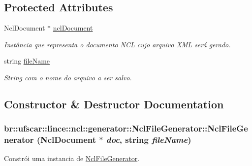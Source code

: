 \subsection*{Protected Attributes}
\begin{DoxyCompactItemize}
\item 
NclDocument $\ast$ \hyperlink{classbr_1_1ufscar_1_1lince_1_1ncl_1_1generator_1_1NclFileGenerator_adbc2970dc25159b55e4b18ef2cf2eb88}{nclDocument}
\begin{DoxyCompactList}\small\item\em Instância que representa o documento NCL cujo arquivo XML será gerado. \item\end{DoxyCompactList}\item 
string \hyperlink{classbr_1_1ufscar_1_1lince_1_1ncl_1_1generator_1_1NclFileGenerator_a32edd0aef97357d73387db337d3329c5}{fileName}
\begin{DoxyCompactList}\small\item\em String com o nome do arquivo a ser salvo. \item\end{DoxyCompactList}\end{DoxyCompactItemize}


\subsection{Constructor \& Destructor Documentation}
\hypertarget{classbr_1_1ufscar_1_1lince_1_1ncl_1_1generator_1_1NclFileGenerator_ae0efa881f57cb070eb0058164021057a}{
\subsubsection[{NclFileGenerator}]{\setlength{\rightskip}{0pt plus 5cm}br::ufscar::lince::ncl::generator::NclFileGenerator::NclFileGenerator (NclDocument $\ast$ {\em doc}, \/  string {\em fileName})}}
\label{classbr_1_1ufscar_1_1lince_1_1ncl_1_1generator_1_1NclFileGenerator_ae0efa881f57cb070eb0058164021057a}


Constrói uma instancia de \hyperlink{classbr_1_1ufscar_1_1lince_1_1ncl_1_1generator_1_1NclFileGenerator}{NclFileGenerator}. 


